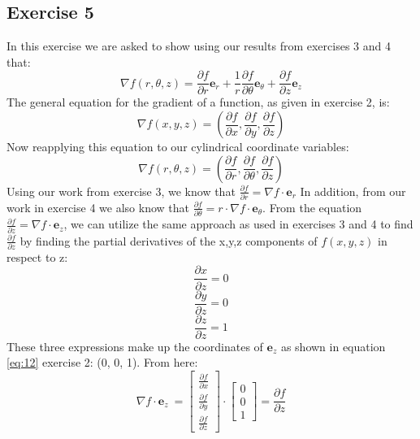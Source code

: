 \documentclass{article}
\begin{document}
\subsection{Exercise 5}
In this exercise we are asked to show using our results from exercises 3 and 4 that:
\begin{equation}
    \nabla f\left(r,\theta,z\right)=\frac{\partial f}{\partial r}\mathbf{e}_{r}+\frac{1}{r}\frac{\partial f}{\partial \theta}\mathbf{e}_{\theta}+\frac{\partial f}{\partial z}\mathbf{e}_{z}
\end{equation}
The general equation for the gradient of a function, as given in exercise 2, is:
\begin{equation}
    \nabla f\left(x,y,z\right)=\left(\frac{\partial f}{\partial x},\frac{\partial f}{\partial y},\frac{\partial f}{\partial z}\right)
\end{equation}
Now reapplying this equation to our cylindrical coordinate variables:
\begin{equation}
    \nabla f\left(r,\theta,z\right)=\left(\frac{\partial f}{\partial r},\frac{\partial f}{\partial\theta},\frac{\partial f}{\partial z}\right)
\end{equation}
Using our work from exercise 3, we know that $\frac{\partial f}{\partial r}=\nabla f\cdot \mathbf{e}_{r}$ In addition, from our work in exercise 4 we also know that $\frac{\partial f}{\partial \theta}=r\cdot \nabla f\cdot \mathbf{e}_{\theta}$.
From the equation $\frac{\partial f}{\partial z}= \nabla f\cdot \mathbf{e}_{z}$, we can utilize the same approach as used in exercises 3 and 4 to find $\frac{\partial f}{\partial z}$ by finding the partial derivatives of the x,y,z components of $f(x,y,z)$ in respect to z:
\begin{equation}
    \frac{\partial x}{\partial z}=0
\end{equation}
\begin{equation}
    \frac{\partial y}{\partial z}=0
\end{equation}
\begin{equation}
    \frac{\partial z}{\partial z}=1
\end{equation}
These three expressions make up the coordinates of $\mathbf{e}_z$ as shown in equation \ref{eq:12} exercise 2: (0, 0, 1). From here:
\begin{equation}
    \nabla f \cdot \mathbf{e}_z\ = 
    \left[\begin{array}{c}
    \frac{\partial f}{\partial x} 
    \\
     \frac{\partial f}{\partial y} 
    \\
     \frac{\partial f}{\partial z} 
    \end{array}\right]
    \cdot
    \left[\begin{array}{c}
    0
    \\
     0
    \\
     1
    \end{array}\right]
    = \frac{\partial f}{\partial z}
\end{equation}
\end{document}
